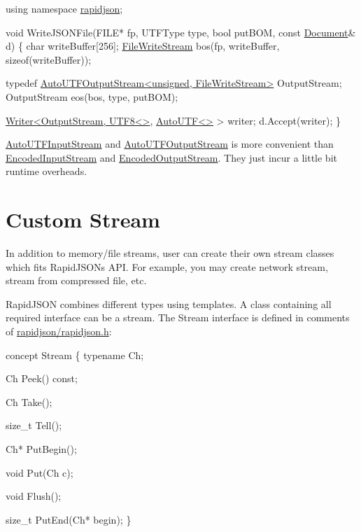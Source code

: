 \begin{DoxyCode}
\textcolor{keyword}{using namespace }\hyperlink{namespacerapidjson}{rapidjson};

\textcolor{keywordtype}{void} WriteJSONFile(FILE* fp, UTFType type, \textcolor{keywordtype}{bool} putBOM, \textcolor{keyword}{const} \hyperlink{class_generic_document}{Document}& d) \{
    \textcolor{keywordtype}{char} writeBuffer[256];
    \hyperlink{class_file_write_stream}{FileWriteStream} bos(fp, writeBuffer, \textcolor{keyword}{sizeof}(writeBuffer));

    \textcolor{keyword}{typedef} \hyperlink{class_auto_u_t_f_output_stream}{AutoUTFOutputStream<unsigned, FileWriteStream>} 
      OutputStream;
    OutputStream eos(bos, type, putBOM);

    \hyperlink{class_writer}{Writer<OutputStream, UTF8<>}, \hyperlink{struct_auto_u_t_f}{AutoUTF<>} > writer;
    d.Accept(writer);
\}
\end{DoxyCode}


{\ttfamily \hyperlink{class_auto_u_t_f_input_stream}{Auto\+U\+T\+F\+Input\+Stream}} and {\ttfamily \hyperlink{class_auto_u_t_f_output_stream}{Auto\+U\+T\+F\+Output\+Stream}} is more convenient than {\ttfamily \hyperlink{class_encoded_input_stream}{Encoded\+Input\+Stream}} and {\ttfamily \hyperlink{class_encoded_output_stream}{Encoded\+Output\+Stream}}. They just incur a little bit runtime overheads.\hypertarget{md_Commun_Externe_RapidJSON_doc_stream.zh-cn_CustomStream}{}\section{Custom Stream}\label{md_Commun_Externe_RapidJSON_doc_stream.zh-cn_CustomStream}
In addition to memory/file streams, user can create their own stream classes which fits Rapid\+J\+S\+ON\textquotesingle{}s A\+PI. For example, you may create network stream, stream from compressed file, etc.

Rapid\+J\+S\+ON combines different types using templates. A class containing all required interface can be a stream. The Stream interface is defined in comments of {\ttfamily \hyperlink{rapidjson_8h}{rapidjson/rapidjson.\+h}}\+:


\begin{DoxyCode}
concept Stream \{
    \textcolor{keyword}{typename} Ch;    

    Ch Peek() \textcolor{keyword}{const};

    Ch Take();

    \textcolor{keywordtype}{size\_t} Tell();

    Ch* PutBegin();

    \textcolor{keywordtype}{void} Put(Ch c);

    \textcolor{keywordtype}{void} Flush();

    \textcolor{keywordtype}{size\_t} PutEnd(Ch* begin);
\}
\end{DoxyCode}



